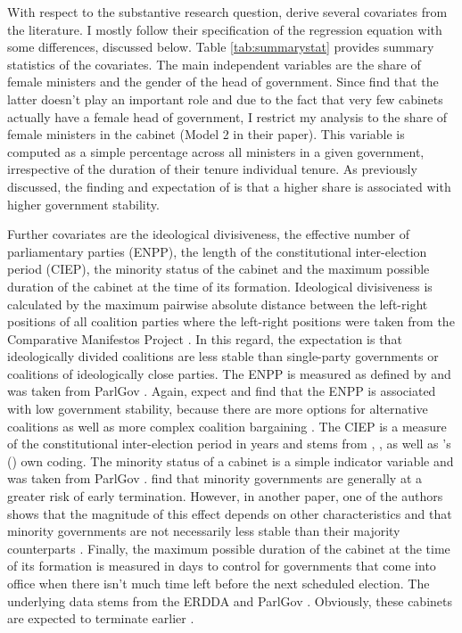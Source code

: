 \documentclass[11pt]{article}
\newcommand\possecite[1]{\citeauthor{#1}'s (\citeyear{#1})}
\begin{document}
With respect to the substantive research question, \textcite{KK20} derive several covariates from the literature. I mostly follow their specification of the regression equation with some differences, discussed below. Table \ref{tab:summarystat} provides summary statistics of the covariates. The main independent variables are the share of female ministers and the gender of the head of government. Since \textcite{KK20} find that the latter doesn't play an important role and due to the fact that very few cabinets actually have a female head of government, I restrict my analysis to the share of female ministers in the cabinet (Model 2 in their paper). This variable is computed as a simple percentage across all ministers in a given government, irrespective of the duration of their tenure individual tenure. As previously discussed, the finding and expectation of \textcite{KK20} is that a higher share is associated with higher government stability. 

Further covariates are the ideological divisiveness, the effective number of parliamentary parties (ENPP), the length of the constitutional inter-election period (CIEP), the minority status of the cabinet and the maximum possible duration of the cabinet at the time of its formation. Ideological divisiveness is calculated by the maximum pairwise absolute distance between the left-right positions of all coalition parties where the left-right positions were taken from the Comparative Manifestos Project \parencite{CMP2018}. In this regard, the expectation is that ideologically divided coalitions are less stable than single-party governments or coalitions of ideologically close parties. The ENPP is measured as defined by \textcite{LaaksoTaagepera1979} and was taken from ParlGov \parencite{parlgov}. Again, \textcite{KK20} expect and find that the ENPP is associated with low government stability, because there are more options for alternative coalitions as well as more complex coalition bargaining \parencite[c.f.][]{Saalfeld2008}. The CIEP is a measure of the constitutional inter-election period in years and stems from \textcite{MullerStrom2008}, \textcite{Krauss2018}, as well as \possecite{KK20} own coding. The minority status of a cabinet is a simple indicator variable and was taken from ParlGov \parencite{parlgov}. \textcite{KK20} find that minority governments are generally at a greater risk of early termination. However, in another paper, one of the authors shows that the magnitude of this effect depends on other characteristics and that minority governments are not necessarily less stable than their majority counterparts \parencite{KraussThürk2021}. Finally, the maximum possible duration of the cabinet at the time of its formation is measured in days to control for governments that come into office when there isn't much time left before the next scheduled election. The underlying data stems from the ERDDA \parencite{ERD2014} and ParlGov \parencite{parlgov}. Obviously, these cabinets are expected to terminate earlier \parencite{KK20}. 
\end{document}
